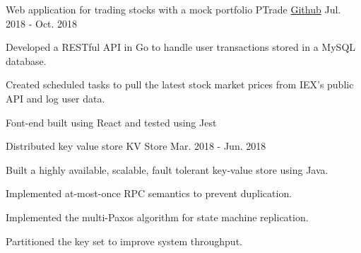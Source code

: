 \begin{cventries}
  \cventry
    {Web application for trading stocks with a mock portfolio} %
    {PTrade} %
    {
      \href{https://github.com/bernardjkim/ptrade}{Github}
    } %
    {Jul. 2018 - Oct. 2018} %
    {
      \begin{cvitems} %
        \item {Developed a RESTful API in Go to handle user transactions stored in a MySQL database.}
        \item {Created scheduled tasks to pull the latest stock market prices from IEX's public API and log user data.}
        \item {Font-end built using React and tested using Jest}
      \end{cvitems}
    }

  \cventry
    {Distributed key value store} %
    {KV Store} %
    {} %
    {Mar. 2018 - Jun. 2018} %
    {
      \begin{cvitems} %
        \item{Built a highly available, scalable, fault tolerant key-value store using Java.}
        \item{Implemented at-most-once RPC semantics to prevent duplication.}
        \item{Implemented the multi-Paxos algorithm for state machine replication.}
        \item{Partitioned the key set to improve system throughput.}
      \end{cvitems}
    }



\end{cventries}
